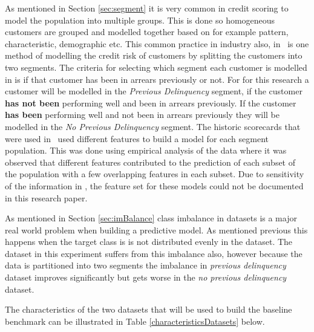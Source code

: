 As mentioned in Section \ref{sec:segment} it is very common in credit scoring to model the population into multiple groups. This is done so homogeneous customers are grouped and modelled together based on for example pattern, characteristic, demographic etc. This common practice in industry also, in \subjectname\ is one method of modelling the credit risk of customers by splitting the customers into two segments. The criteria for selecting which segment each customer is modelled in is if that customer has been in arrears previously or not. For for this research a customer will be modelled in the \textit{Previous Delinquency} segment, if the customer \textbf{has not been} performing well and been in arrears previously. If the customer \textbf{has been } performing well and not been in arrears previously they will be modelled in the \textit{No Previous Delinquency} segment. The historic scorecards that were used in \subjectname\ used different features to build a model for each segment population. This was done using empirical analysis of the data where it was observed that different features contributed to the prediction of each subset of the population with a few overlapping features in each subset. Due to sensitivity of the information in \subjectname, the feature set for these models could not be documented in this research paper.

As mentioned in Section \ref{sec:imBalance} class imbalance in datasets is a major real world problem when building a predictive model. As mentioned previous this happens when the target class is is not distributed evenly in the dataset. The dataset in this experiment suffers from this imbalance also, however because the data is partitioned into two segments the imbalance in \textit{previous delinquency} dataset improves significantly but gets worse in the \textit{no previous delinquency} dataset.

The characteristics of the two datasets that will be used to build the baseline benchmark can be illustrated in Table \ref{characteristicsDatasets} below.

